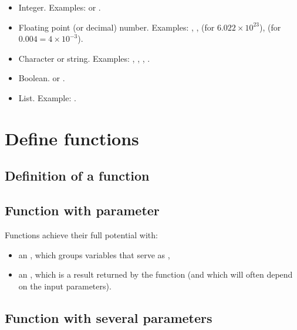 \documentclass[11pt,class=report,crop=false]{standalone}
\begin{document}
\begin{itemize}
  \item {} \quad Integer. Examples:  or .
  \item {} \quad Floating point (or decimal) number. Examples: , ,  (for $6.022 \times 10^{23}$),  (for $0.004 = 4 \times 10^{-3}$).
  \item {} \quad Character or string. Examples: ,
  , , . 
  \item {} \quad Boolean.  or .
  \item {} \quad List. Example: \ci{[1,2,3,4]}.
\end{itemize}



\section{Define functions}

\subsection{Definition of a function}


\subsection{Function with parameter}

Functions achieve their full potential with:
\begin{itemize}
  \item an , which groups variables that serve as ,
  \item an , which is a result returned by the function (and which will often depend on the input parameters).
\end{itemize}




\subsection{Function with several parameters}
\end{document}
